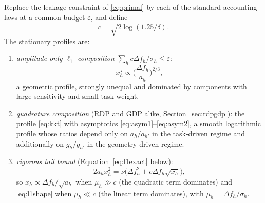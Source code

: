 \begin{theorem}
\label{th:shape}
Replace the leakage constraint of \eqref{eq:primal} by each of the standard
accounting laws at a common budget $\varepsilon$, and define
\begin{equation}
c=\sqrt{2\log(1.25/\delta)}.
\label{eq:tailconst}
\end{equation}
The stationary profiles are:
\begin{enumerate}
\item[(a)] \emph{amplitude-only $\ell_1$ composition}
$\sum_h c\Delta f_h/\sigma_h\le\varepsilon$:
\begin{equation}
x_h^{\star}\propto\Big(\frac{\Delta f_h}{a_h}\Big)^{2/3},
\label{eq:l1shape}
\end{equation}
a geometric profile, strongly unequal and dominated by components with large
sensitivity and small task weight.
\item[(b)] \emph{quadrature composition} (RDP and GDP alike,
Section~\ref{sec:rdpgdp}): the profile \eqref{eq:kkt} with asymptotics
\eqref{eq:asym1}--\eqref{eq:asym2},
a smooth logarithmic profile whose ratios depend only on $a_h/a_{h'}$ in the
task-driven regime and additionally on $g_h/g_{h'}$ in the geometry-driven
regime.
\item[(c)] \emph{rigorous tail bound} (Equation~\eqref{eq:l1exact} below):
\begin{equation}
2a_hx_h^{2}=\nu\big(\Delta f_h^{2}+c\Delta f_h\sqrt{x_h}\big),
\label{eq:l1exactshape}
\end{equation}
so $x_h\propto\Delta f_h/\sqrt{a_h}$ when $\mu_h\gg c$ (the quadratic term
dominates) and \eqref{eq:l1shape} when $\mu_h\ll c$ (the linear term dominates),
with $\mu_h=\Delta f_h/\sigma_h$.
\end{enumerate}
\end{theorem}

